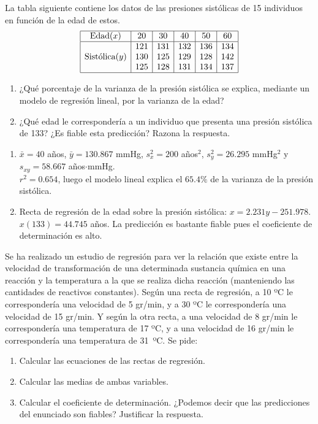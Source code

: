 {La tabla siguiente contiene los datos de las presiones sistólicas de 15 individuos en función de la edad de estos.
\[
\begin{array}{|c|c|c|c|c|c|}
\hline
\text{Edad} (x) & 20 & 30 & 40 & 50 & 60 \\
\hline
& 121 & 131 & 132 & 136 & 134\\
\text{Sistólica} (y) & 130 & 125 & 129 & 128 & 142 \\
& 125 & 128 & 131 & 134 & 137\\
\hline
\end{array}
\]

\begin{enumerate}
\item ¿Qué porcentaje de la varianza de la presión sistólica se explica, mediante un modelo de regresión lineal, por la
varianza de la edad? 
\item ¿Qué edad le correspondería a un individuo que presenta una presión sistólica de 133?
¿Es fiable esta predicción?
Razona la respuesta. 
\end{enumerate}
}
{
\begin{enumerate}
\item $\bar x=40$ años, $\bar y=130.867$ mmHg, $s_x^2=200$ años$^2$, $s_y^2=26.295$ mmHg$^2$ y $s_{xy}=58.667$
años$\cdot$mmHg.\\
$r^2=0.654$, luego el modelo lineal explica el $65.4\%$ de la varianza de la presión sistólica.
\item Recta de regresión de la edad sobre la presión sistólica: $x=2.231y-251.978$.\\
$x(133)=44.745$ años. La predicción es bastante fiable pues el coeficiente de determinación es alto.
\end{enumerate}
}
{}


{Se ha realizado un estudio de regresión para ver la relación que existe entre la velocidad de transformación de una determinada sustancia química en una reacción y la temperatura a la que se realiza dicha reacción (manteniendo las cantidades de reactivos constantes).
Según una recta de regresión, a 10 ºC le correspondería una velocidad de 5 gr/min, y a 30 ºC le correspondería una velocidad de 15 gr/min.
Y según la otra recta, a una velocidad de 8 gr/min le correspondería una temperatura de 17 ºC, y a una velocidad de 16 gr/min le correspondería una temperatura de \mbox{31 ºC}. Se pide:
\begin{enumerate}
\item Calcular las ecuaciones de las rectas de regresión.
\item Calcular las medias de ambas variables.
\item Calcular el coeficiente de determinación. ¿Podemos decir que las predicciones del enunciado son fiables? Justificar la respuesta.
\end{enumerate}
}
{}
{}


